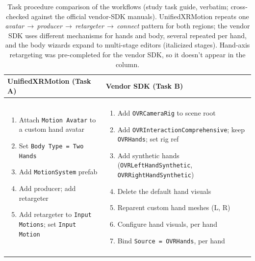 \documentclass[runningheads]{llncs}
\newenvironment{cellsteps}
  {\begin{enumerate}[leftmargin=*,labelsep=0.4em,labelindent=0pt,
       topsep=0pt,partopsep=0pt,itemsep=1pt,parsep=0pt,label=\arabic*.]}
  {\end{enumerate}}
\newcommand{\radd}[1]{\textcolor{revadd}{#1}}
\newcommand{\radd}[1]{#1}
\begin{document}
\begin{table}[t]
	\caption{\radd{Task procedure comparison of the workflows (study task guide,
			verbatim; cross-checked against the official vendor-SDK manuals). 
      UnifiedXRMotion repeats one \emph{avatar\,$\to$\,producer\,$\to$\,retargeter\,$\to$\,connect} pattern for both regions; the vendor SDK uses different mechanisms for hands and body, several repeated per hand, and the body wizards expand to multi-stage
			editors (italicized stages). Hand-axis retargeting was pre-completed for the
			vendor SDK, so it doesn't appear in the column.}}
	\label{tab:task-procedure}
	\centering
	\scriptsize
	\setlength{\tabcolsep}{4pt}
	\renewcommand{\arraystretch}{1.1}
	\begin{tabularx}{\textwidth}{@{}>{\raggedright\arraybackslash}X >{\raggedright\arraybackslash}X@{}}
		\toprule
		UnifiedXRMotion (Task A) & Vendor SDK (Task B) \\
		\midrule
		\multicolumn{2}{@{}l}{\textbf{Hands}} \\
		\addlinespace[2pt]
		\begin{cellsteps}
		     \item Attach \texttt{Motion\,Avatar} to a custom hand avatar
		     \item Set \texttt{Body\,Type\,=\,Two\,Hands}
		     \item Add \texttt{MotionSystem} prefab
		     \item Add producer; add retargeter
		     \item Add retargeter to \texttt{Input\,Motions}; set \texttt{Input\,Motion}
		   \end{cellsteps}
		 & \begin{cellsteps}
		     \item Add \texttt{OVRCameraRig} to scene root
		     \item Add \texttt{OVRInteractionComprehensive}; keep \texttt{OVRHands}; set rig ref
		     \item Add synthetic hands (\texttt{OVRLeftHandSynthetic}, \texttt{OVRRightHandSynthetic})
		     \item Delete the default hand visuals
		     \item Reparent custom hand meshes (L, R)
		     \item Configure hand visuals, per hand
		     \item Bind \texttt{Source\,=\,OVRHands}, per hand
		   \end{cellsteps} \\
		\midrule
		\multicolumn{2}{@{}l}{\textbf{Body}} \\

\end{tabularx}
\end{table}
\end{document}
